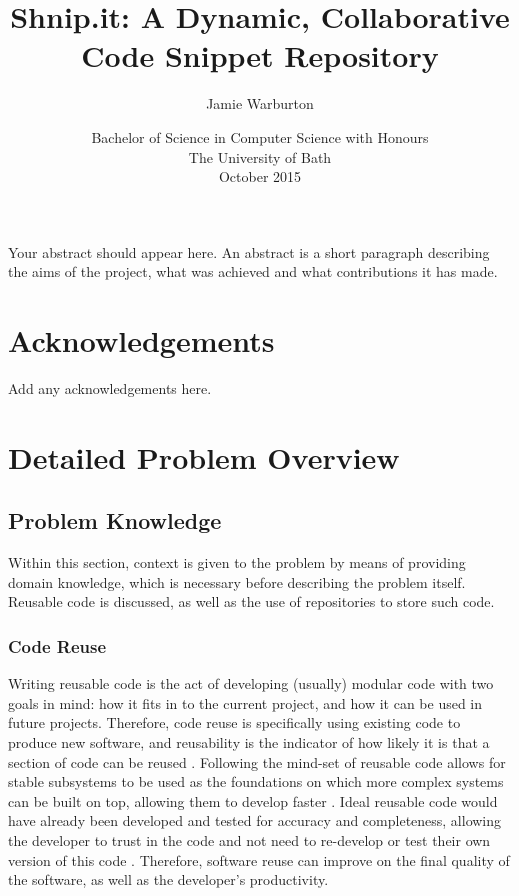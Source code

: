 \documentclass[11pt,openright,a4paper]{report}
\title{Shnip.it: A Dynamic, Collaborative Code Snippet Repository}
\author{Jamie Warburton}
\date{Bachelor of Science in Computer Science with Honours\\The University of Bath\\October 2015}
\begin{document}
\lstset{language=Java,breaklines,breakatwhitespace,basicstyle=\small}


\setcounter{page}{0}


\maketitle
\newpage


\newpage


\newpage


\abstract
Your abstract should appear here.  An abstract is a short
paragraph describing the aims of the project, what was
achieved and what contributions it has made.
\newpage


\tableofcontents
\newpage
\listoffigures
\newpage
\listoftables
\newpage


\chapter*{Acknowledgements}
Add any acknowledgements here.
\newpage


\setcounter{page}{1}



\chapter{Detailed Problem Overview}
\section{Problem Knowledge}
Within this section, context is given to the problem by means of providing domain knowledge, which is necessary before describing the problem itself. Reusable code is discussed, as well as the use of repositories to store such code. 

\subsection{Code Reuse}
Writing reusable code is the act of developing (usually) modular code with two goals in mind: how it fits in to the current project, and how it can be used in future projects.
Therefore, code reuse is specifically using existing code to produce new software, and reusability is the indicator of how likely it is that a section of code can be reused \cite{Frakes2005}. 
Following the mind-set of reusable code allows for stable subsystems to be used as the foundations on which more complex systems can be built on top, allowing them to develop faster \cite{Yunwen2000}.
Ideal reusable code would have already been developed and tested for accuracy and completeness, allowing the developer to trust in the code and not need to re-develop or test their own version of this code \cite{Grinter2001}. Therefore, software reuse can improve on the final quality of the software, as well as the developer’s productivity.
\end{document}
